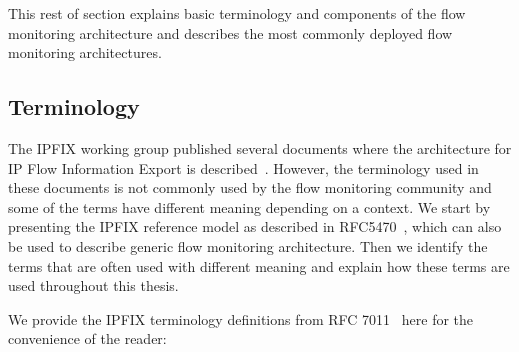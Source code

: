 This rest of section explains basic terminology and components of the flow monitoring architecture and describes the most commonly deployed flow monitoring architectures.

\subsection{Terminology}

The IPFIX working group published several documents where the architecture for IP Flow Information Export is described~\cite{rfc5470, rfc6183}. However, the terminology used in these documents is not commonly used by the flow monitoring community and some of the terms have different meaning depending on a context. We start by presenting the IPFIX reference model as described in RFC5470~\cite{rfc5470}, which can also be used to describe generic flow monitoring architecture. Then we identify the terms that are often used with different meaning and explain how these terms are used throughout this thesis.

We provide the IPFIX terminology definitions from RFC 7011~\cite{rfc7011} here for the convenience of the reader:

